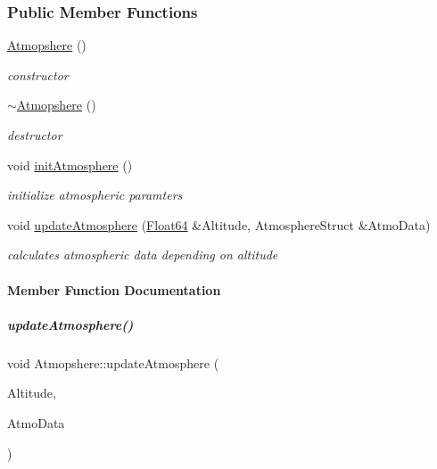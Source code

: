 \subsubsection*{Public Member Functions}
\begin{DoxyCompactItemize}
\item 
\mbox{\label{group___atmosphere_a77ca553d3c4e855dd921a451d65cc313}} 
\hyperlink{group___atmosphere_a77ca553d3c4e855dd921a451d65cc313}{Atmopshere} ()
\begin{DoxyCompactList}\small\item\em constructor \end{DoxyCompactList}\item 
\mbox{\label{group___atmosphere_ac7815ca8008ed54dc758f2bf7a6104f7}} 
\hyperlink{group___atmosphere_ac7815ca8008ed54dc758f2bf7a6104f7}{$\sim$\+Atmopshere} ()
\begin{DoxyCompactList}\small\item\em destructor \end{DoxyCompactList}\item 
\mbox{\label{group___atmosphere_a6e1d5763fbb6631784c99ee3c88911bd}} 
void \hyperlink{group___atmosphere_a6e1d5763fbb6631784c99ee3c88911bd}{init\+Atmosphere} ()
\begin{DoxyCompactList}\small\item\em initialize atmospheric paramters \end{DoxyCompactList}\item 
void \hyperlink{group___atmosphere_a2bd97471d32725d6196ee6816ea36c99}{update\+Atmosphere} (\hyperlink{group___tools_ga3f1431cb9f76da10f59246d1d743dc2c}{Float64} \&Altitude, Atmosphere\+Struct \&Atmo\+Data)
\begin{DoxyCompactList}\small\item\em calculates atmospheric data depending on altitude \end{DoxyCompactList}\end{DoxyCompactItemize}


\paragraph{Member Function Documentation}
\mbox{\label{group___atmosphere_a2bd97471d32725d6196ee6816ea36c99}} 
\subparagraph{\texorpdfstring{update\+Atmosphere()}{updateAtmosphere()}}
{\footnotesize\ttfamily void Atmopshere\+::update\+Atmosphere (\begin{DoxyParamCaption}\item[{\hyperlink{group___tools_ga3f1431cb9f76da10f59246d1d743dc2c}{Float64} \&}]{Altitude,  }\item[{Atmosphere\+Struct \&}]{Atmo\+Data }\end{DoxyParamCaption})}



